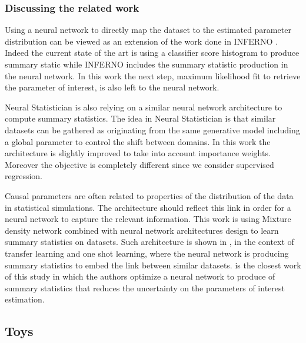 \subsubsection{Discussing the related work} 

Using a neural network to directly map the dataset to the estimated parameter distribution can be viewed as an extension of the work done in INFERNO \cite{DECASTRO2019170inferno}. 
Indeed the current state of the art is using a classifier score histogram to produce summary static while INFERNO includes the summary statistic production in the neural network.
In this work the next step, maximum likelihood fit to retrieve the parameter of interest, is also left to the neural network.

Neural Statistician \cite{Edwards17neuralstatistician} is also relying on a similar neural network architecture to compute summary statistics.
The idea in Neural Statistician is that similar datasets can be gathered as originating from the same generative model including a global parameter to control the shift between domains.
In this work the architecture is slightly improved to take into account importance weights.
Moreover the objective is completely different since we consider supervised regression.

Causal parameters are often related to properties of the distribution of the data in statistical simulations.
The architecture should reflect this link in order for a neural network to capture the relevant information.
This work is using Mixture density network \cite{Bishop94mixturedensity} combined with neural network architectures design to learn summary statistics on datasets.
Such architecture is shown in \cite{Edwards17neuralstatistician}, in the context of transfer learning and one shot learning, where the neural network is producing summary statistics to embed the link between similar datasets.
\cite{DECASTRO2019170inferno} is the closest work of this study in which the authors optimize a neural network to produce of summary statistics that reduces the uncertainty on the parameters of interest estimation.




\subsection{Toys} %
\label{sub:toys}


